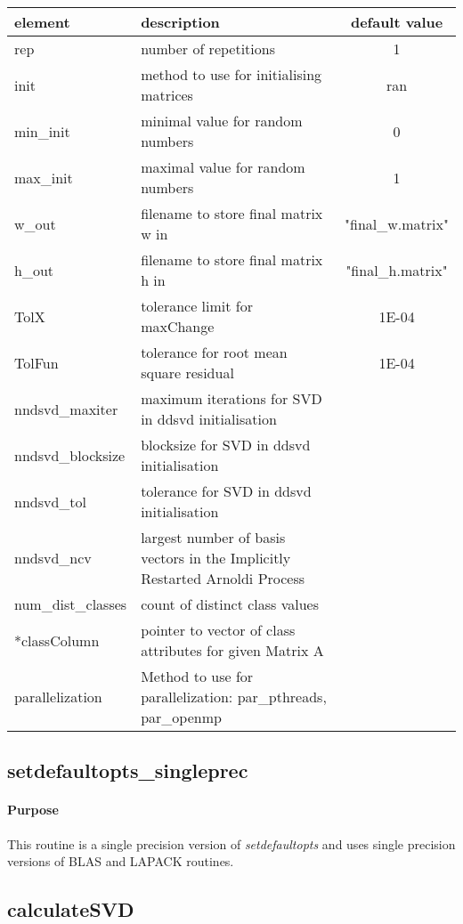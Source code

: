 \documentclass[a4paper,10pt]{scrartcl}
\begin{document}
			\begin{tabular}{l|l|c}
 			 	element & description & default value\\
				\hline
 				rep & number of repetitions & 1\\
 				init & method to use for initialising matrices & ran\\
 				min\_init & minimal value for random numbers & 0\\
 				max\_init & maximal value for random numbers & 1\\
 				w\_out & filename to store final matrix w in & "final\_w.matrix"\\
 				h\_out & filename to store final matrix h in & "final\_h.matrix"\\
 				TolX & tolerance limit for maxChange & 1E-04\\
 				TolFun & tolerance for root mean square residual & 1E-04\\
				nndsvd\_maxiter & maximum iterations for SVD in ddsvd initialisation & \\
				nndsvd\_blocksize & blocksize for SVD in ddsvd initialisation &\\
				nndsvd\_tol & tolerance for SVD in ddsvd initialisation&\\
				nndsvd\_ncv & largest number of basis vectors in the Implicitly Restarted Arnoldi Process&\\
				num\_dist\_classes & count of distinct class values&\\
				*classColumn & pointer to vector of class attributes for given Matrix A&\\
				parallelization & Method to use for parallelization: par\_pthreads, par\_openmp&\\
			\end{tabular}

		\subsection{setdefaultopts\_singleprec}

			\paragraph{Purpose}

			This routine is a single precision version of \emph{setdefaultopts} and uses single precision versions
			of BLAS and LAPACK routines.

		\subsection{calculateSVD}
\end{document}
